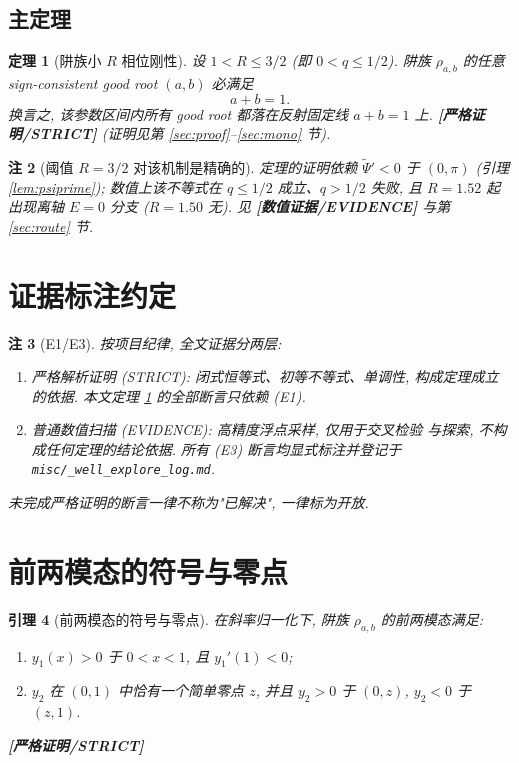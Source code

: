 \documentclass[UTF8]{ctexart}
\newtheorem{theorem}{定理}[section]
\newtheorem{lemma}[theorem]{引理}
\newtheorem{remark}[theorem]{注}
\newcommand{\STRICT}{\textbf{[严格证明/STRICT]}}
\newcommand{\EVID}{\textbf{[数值证据/EVIDENCE]}}
\begin{document}
\subsection{主定理}

\begin{theorem}[阱族小 $R$ 相位刚性]\label{thm:main}
	设 $1<R\le 3/2$ (即 $0<q\le 1/2$). 阱族 $\rho_{a,b}$ 的任意
	sign-consistent good root $(a,b)$ 必满足
	\begin{equation}
		a+b=1.
	\end{equation}
	换言之, 该参数区间内所有 good root 都落在反射固定线 $a+b=1$ 上.
	\STRICT{} (证明见第 \ref{sec:proof}--\ref{sec:mono} 节).
\end{theorem}

\begin{remark}[阈值 $R=3/2$ 对该机制是精确的] \label{rem:threshold}
	定理的证明依赖 $\widetilde\Psi'<0$ 于 $(0,\pi)$ (引理 \ref{lem:psiprime});
	数值上该不等式在 $q\le 1/2$ 成立、$q>1/2$ 失败, 且 $R=1.52$ 起出现离轴 $E=0$
	分支 ($R=1.50$ 无). 见 \EVID{} 与第 \ref{sec:route} 节.
\end{remark}

\section{证据标注约定}

\begin{remark}[E1/E3]\label{rem:evidence}
	按项目纪律, 全文证据分两层:
	\begin{enumerate}
		\item[(E1)] \emph{严格解析证明} (STRICT): 闭式恒等式、初等不等式、单调性,
			构成定理成立的依据. 本文定理 \ref{thm:main} 的全部断言只依赖 (E1).
		\item[(E3)] \emph{普通数值扫描} (EVIDENCE): 高精度浮点采样, 仅用于交叉检验
			与探索, 不构成任何定理的结论依据. 所有 (E3) 断言均显式标注并登记于
			\texttt{misc/\_well\_explore\_log.md}.
	\end{enumerate}
	未完成严格证明的断言一律不称为"已解决", 一律标为开放.
\end{remark}

\section{前两模态的符号与零点}\label{sec:modes}

\begin{lemma}[前两模态的符号与零点]\label{lem:modes}
	在斜率归一化下, 阱族 $\rho_{a,b}$ 的前两模态满足:
	\begin{enumerate}
		\item[(i)] $y_1(x)>0$ 于 $0<x<1$, 且 $y_1'(1)<0$;
		\item[(ii)] $y_2$ 在 $(0,1)$ 中恰有一个简单零点 $z$, 并且
			$y_2>0$ 于 $(0,z)$, $y_2<0$ 于 $(z,1)$.
	\end{enumerate}
	\STRICT{}
\end{lemma}
\end{document}

